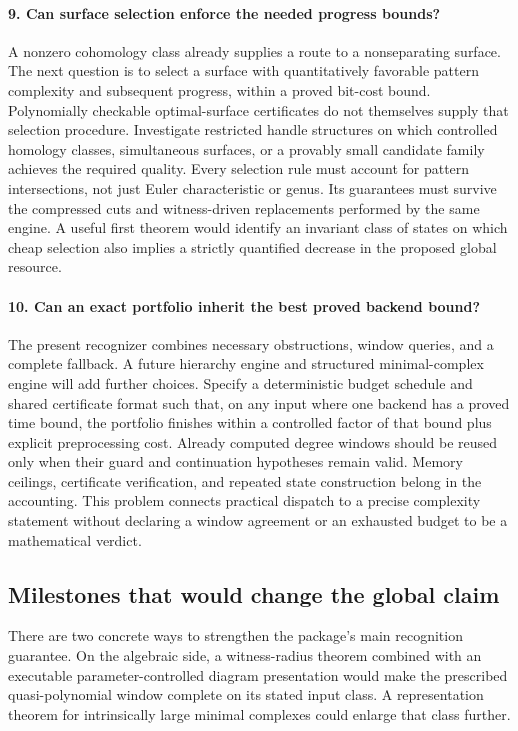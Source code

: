 \paragraph{9. Can surface selection enforce the needed progress bounds?}
A nonzero cohomology class already supplies a route to a nonseparating
surface.  The next question is to select a surface with quantitatively
favorable pattern complexity and subsequent progress, within a proved
bit-cost bound.  Polynomially checkable optimal-surface certificates do
not themselves supply that selection procedure.  Investigate restricted
handle structures on which controlled homology classes, simultaneous
surfaces, or a provably small candidate family achieves the required
quality.  Every selection rule must account for pattern intersections,
not just Euler characteristic or genus.  Its guarantees must survive
the compressed cuts and witness-driven replacements performed by the
same engine.  A useful first theorem would identify an invariant class
of states on which cheap selection also implies a strictly quantified
decrease in the proposed global resource.

\paragraph{10. Can an exact portfolio inherit the best proved backend bound?}
The present recognizer combines necessary obstructions, window queries,
and a complete fallback.  A future hierarchy engine and structured
minimal-complex engine will add further choices.  Specify a deterministic
budget schedule and shared certificate format such that, on any input
where one backend has a proved time bound, the portfolio finishes within
a controlled factor of that bound plus explicit preprocessing cost.
Already computed degree windows should be reused only when their
guard and continuation hypotheses remain valid.  Memory ceilings,
certificate verification, and repeated state construction belong in
the accounting.  This problem connects practical dispatch to a precise
complexity statement without declaring a window agreement or an
exhausted budget to be a mathematical verdict.

\subsection{Milestones that would change the global claim}

There are two concrete ways to strengthen the package's main
recognition guarantee.  On the algebraic side, a witness-radius theorem
combined with an executable parameter-controlled diagram presentation
would make the prescribed quasi-polynomial window complete on its stated
input class.  A representation theorem for intrinsically large
minimal complexes could enlarge that class further.

